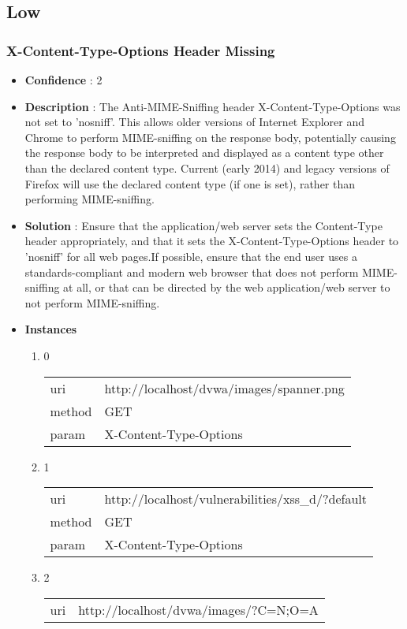 \documentclass[10pt]{article}
\begin{document}
\subsection{Low}
\subsubsection{X-Content-Type-Options Header Missing}
\begin{itemize}
\item[] \textbf{Confidence} : 2
\item[] \textbf{Description} : The Anti-MIME-Sniffing header X-Content-Type-Options was not set to 'nosniff'. This allows older versions of Internet Explorer and Chrome to perform MIME-sniffing on the response body, potentially causing the response body to be interpreted and displayed as a content type other than the declared content type. Current (early 2014) and legacy versions of Firefox will use the declared content type (if one is set), rather than performing MIME-sniffing.
\item[] \textbf{Solution} :  Ensure that the application/web server sets the Content-Type header appropriately, and that it sets the X-Content-Type-Options header to 'nosniff' for all web pages.If possible, ensure that the end user uses a standards-compliant and modern web browser that does not perform MIME-sniffing at all, or that can be directed by the web application/web server to not perform MIME-sniffing.
\item[] \textbf{Instances}
\begin{enumerate}
\item[] 0
\begin{tabular}{| l | p{12cm}}
uri & http://localhost/dvwa/images/spanner.png \\
method & GET \\
param & X-Content-Type-Options \\
\end{tabular}
\item[] 1
\begin{tabular}{| l | p{12cm}}
uri & http://localhost/vulnerabilities/xss\_d/?default \\
method & GET \\
param & X-Content-Type-Options \\
\end{tabular}
\item[] 2
\begin{tabular}{| l | p{12cm}}
uri & http://localhost/dvwa/images/?C=N;O=A \\

\end{tabular}
\end{enumerate}
\end{itemize}
\end{document}
